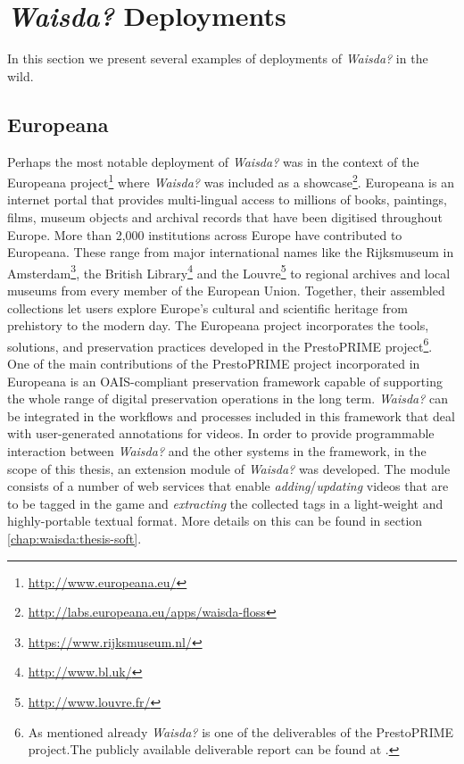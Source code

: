 \section{\textit{Waisda?} Deployments}
In this section we present several examples of deployments of \textit{Waisda?} in the wild.

\subsection{Europeana}\label{sec:waisda-europeana}
Perhaps the most notable deployment of \textit{Waisda?} was in the context of the Europeana project\footnote{\url{http://www.europeana.eu/}} where \textit{Waisda?} was included as a showcase\footnote{\url{http://labs.europeana.eu/apps/waisda-floss}}. Europeana is an internet portal that provides multi-lingual access to millions of books, paintings, films, museum objects and archival records that have been digitised throughout Europe. More than 2,000 institutions across Europe have contributed to Europeana. These range from major international names like the Rijksmuseum in Amsterdam\footnote{\url{https://www.rijksmuseum.nl/}}, the British Library\footnote{\url{http://www.bl.uk/}} and the Louvre\footnote{\url{http://www.louvre.fr/}} to regional archives and local museums from every member of the European Union. Together, their assembled collections let users explore Europe's cultural and scientific heritage from prehistory to the modern day. The Europeana project incorporates the tools, solutions, and preservation practices developed in the PrestoPRIME project\footnote{As mentioned already \textit{Waisda?} is one of the deliverables of the PrestoPRIME project.The publicly available deliverable report can be found at \cite{prestoprime-report}.}. One of the main contributions of the PrestoPRIME project incorporated in Europeana is an OAIS-compliant preservation framework capable of supporting the whole range of digital preservation operations in the long term. \textit{Waisda?} can be integrated in the workflows and processes included in this framework that deal with user-generated annotations for videos. In order to provide programmable interaction between \textit{Waisda?} and the other systems in the framework, in the scope of this thesis, an extension module of \textit{Waisda?} was developed. The module consists of a number of web services that enable \textit{adding}/\textit{updating} videos that are to be tagged in the game and \textit{extracting} the collected tags in a light-weight and highly-portable textual format. More details on this can be found in section \ref{chap:waisda:thesis-soft}. 

